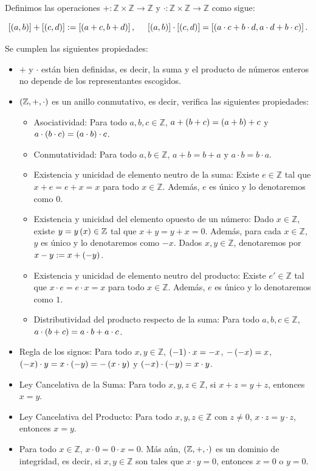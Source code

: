 \begin{proposition}
  \rm Definimos las operaciones $+:\mathbb{Z}\times\mathbb{Z}\rightarrow\mathbb{Z}$ y $\cdot:\mathbb{Z}\times\mathbb{Z}\rightarrow\mathbb{Z}$ como sigue:

  \begin{equation}
    \left[\left(a,b\right)\right]+\left[\left(c,d\right)\right]:=\left[\left(a+c,b+d\right)\right],\hspace{0.5cm}\left[\left(a,b\right)\right]\cdot\left[\left(c,d\right)\right]=\left[\left(a\cdot c+b\cdot d,a\cdot d+b\cdot c\right)\right].
  \end{equation}

  Se cumplen las siguientes propiedades:

  \begin{itemize}
    \item[1.] $+$ y $\cdot$ están bien definidas, es decir, la suma y el producto de números enteros no depende de los representantes escogidos.
    \item[2.] $\left(\mathbb{Z},+,\cdot\right)$ es un anillo conmutativo, es decir, verifica las siguientes propiedades:
    \begin{itemize}
      \item Asociatividad: Para todo $a,b,c\in\mathbb{Z}$, $a+\left(b+c\right)=\left(a+b\right)+c$ y $a\cdot\left(b\cdot c\right)=\left(a\cdot b\right)\cdot c$.
      \item Conmutatividad: Para todo $a,b\in\mathbb{Z}$, $a+b=b+a$ y $a\cdot b=b\cdot a$.
      \item Existencia y unicidad de elemento neutro de la suma: Existe $e\in\mathbb{Z}$ tal que $x+e=e+x=x$ para todo $x\in\mathbb{Z}$. Además, $e$ es único y lo denotaremos como $0$.
      \item Existencia y unicidad del elemento opuesto de un número: Dado $x\in\mathbb{Z}$, existe $y=y\left(x\right)\in\mathbb{Z}$ tal que $x+y=y+x=0$. Además, para cada $x\in\mathbb{Z}$, $y$ es único y lo denotaremos como $-x$. Dados $x,y\in\mathbb{Z}$, denotaremos por $x-y:=x+\left(-y\right)$.
      \item Existencia y unicidad de elemento neutro del producto: Existe $e'\in\mathbb{Z}$ tal que $x\cdot e=e\cdot x=x$ para todo $x\in\mathbb{Z}$. Además, $e$ es único y lo denotaremos como $1$.
      \item Distributividad del producto respecto de la suma: Para todo $a,b,c\in\mathbb{Z}$, $a\cdot \left(b+c\right)=a\cdot b+a\cdot c$.
    \end{itemize}
    \item[3.] Regla de los signos: Para todo $x,y\in\mathbb{Z}$, $\left(-1\right)\cdot x=-x$, $-\left(-x\right)=x$, $\left(-x\right)\cdot y=x\cdot\left(-y\right)=-\left(x\cdot y\right)$ y $\left(-x\right)\cdot\left(-y\right)=x\cdot y$.
    \item[4.] Ley Cancelativa de la Suma: Para todo $x,y,z\in\mathbb{Z}$, si $x+z=y+z$, entonces $x=y$.
    \item[5.] Ley Cancelativa del Producto: Para todo $x,y,z\in\mathbb{Z}$ con $z\neq 0$, $x\cdot z=y\cdot z$, entonces $x=y$.
    \item[6.] Para todo $x\in\mathbb{Z}$, $x\cdot 0=0\cdot x=0$. Más aún, $\left(\mathbb{Z},+,\cdot\right)$ es un dominio de integridad, es decir, si $x,y\in\mathbb{Z}$ son tales que $x\cdot y=0$, entonces $x=0$ o $y=0$.
  \end{itemize}
\end{proposition}

